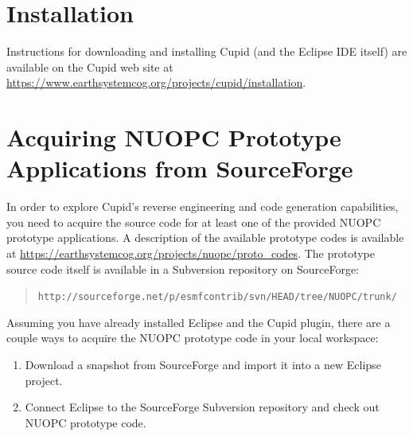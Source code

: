 \documentclass[oneside,11pt]{memoir}
\begin{document}


\section{Installation}

Instructions for downloading and installing Cupid (and the Eclipse IDE itself) are available on the Cupid web site at \href{https://www.earthsystemcog.org/projects/cupid/installation}{https://www.earthsystemcog.org/projects/cupid/installation}.


\section{Acquiring NUOPC Prototype Applications from SourceForge}

In order to explore Cupid's reverse engineering and code generation capabilities, you need to acquire the source code for at least one of the provided NUOPC prototype applications. A description of the available prototype codes is available at \href{https://earthsystemcog.org/projects/nuopc/proto\_codes}{https://earthsystemcog.org/projects/nuopc/proto\_codes}. The prototype source code itself is available in a Subversion repository on SourceForge:

\begin{quote}
\texttt{http://sourceforge.net/p/esmfcontrib/svn/HEAD/tree/NUOPC/trunk/}
\end{quote}

Assuming you have already installed Eclipse and the Cupid plugin, there are a couple ways to acquire the NUOPC prototype code in your local workspace:
\begin{enumerate}
\item Download a snapshot from SourceForge and import it into a new Eclipse project.
\item Connect Eclipse to the SourceForge Subversion repository and check out NUOPC prototype code.
\end{enumerate}
\end{document}
